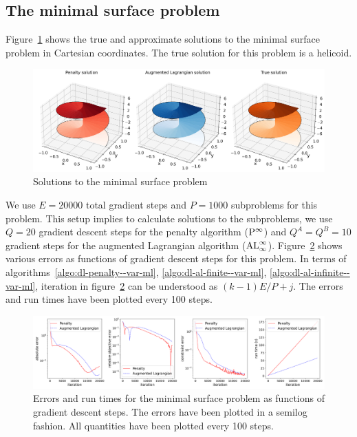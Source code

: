 \subsection{The minimal surface problem}
Figure~\ref{fig:helicoid-surface--var-ml} shows the true and approximate solutions to the minimal surface problem in Cartesian coordinates. The true solution for this problem is a helicoid. 
\begin{figure}[!ht]
    \centering
\includegraphics[scale=0.4]{var-ml/plots/var-plots-helicoid-surface.png}
    \caption{Solutions to the minimal surface problem}
    \label{fig:helicoid-surface--var-ml}
\end{figure}
We use $E=20000$ total gradient steps and $P=1000$ subproblems for this problem. This setup implies to calculate solutions to the subproblems, we use $Q=20$ gradient descent steps for the penalty algorithm (${\rm P}^\infty$) and $Q^A=Q^B=10$ gradient steps for the augmented Lagrangian algorithm (${\rm AL}^\infty_\infty$). Figure~\ref{fig:helicoid-error--var-ml} shows various errors as functions of gradient descent steps for this problem. In terms of algorithms~\ref{algo:dl-penalty--var-ml}, \ref{algo:dl-al-finite--var-ml}, \ref{algo:dl-al-infinite--var-ml}, iteration in figure~\ref{fig:helicoid-error--var-ml} can be understood as $(k-1)E/P+j$. The errors and run times have been plotted every 100 steps.
\begin{figure}[!ht]
    \centering
\includegraphics[scale=0.32]{var-ml/plots/var-plots-helicoid-error.png}
    \caption{Errors and run times for the minimal surface problem as functions of gradient descent steps. The errors have been plotted in a semilog fashion. All quantities have been plotted every 100 steps.}
    \label{fig:helicoid-error--var-ml}
\end{figure}
